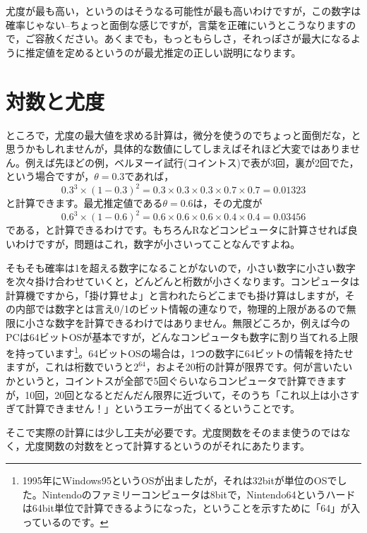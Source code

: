 \documentclass{ltjsarticle}
\begin{document}
尤度が最も高い，というのはそうなる可能性が最も高いわけですが，この数字は確率じゃない--ちょっと面倒な感じですが，言葉を正確にいうとこうなりますので，ご容赦ください。あくまでも，もっともらしさ，それっぽさが最大になるように推定値を定めるというのが最尤推定の正しい説明になります。
\section{対数と尤度}
ところで，尤度の最大値を求める計算は，微分を使うのでちょっと面倒だな，と思うかもしれませんが，具体的な数値にしてしまえばそれほど大変ではありません。例えば先ほどの例，ベルヌーイ試行(コイントス)で表が3回，裏が2回でた，という場合ですが，$\theta=0.3$であれば，
\[ 0.3^3 \times (1-0.3)^2 = 0.3 \times 0.3 \times 0.3 \times 0.7 \times 0.7 = 0.01323 \]
と計算できます。最尤推定値である$\theta=0.6$は，その尤度が
\[ 0.6^3 \times (1-0.6)^2 = 0.6 \times 0.6 \times 0.6 \times 0.4 \times 0.4 = 0.03456 \]
である，と計算できるわけです。もちろんRなどコンピュータに計算させれば良いわけですが，問題はこれ，数字が小さいってことなんですよね。

そもそも確率は1を超える数字になることがないので，小さい数字に小さい数字を次々掛け合わせていくと，どんどんと桁数が小さくなります。コンピュータは計算機ですから，「掛け算せよ」と言われたらどこまでも掛け算はしますが，その内部では数字とは言え0/1のビット情報の連なりで，物理的上限があるので無限に小さな数字を計算できるわけではありません。無限どころか，例えば今のPCは64ビットOSが基本ですが，どんなコンピュータも数字に割り当てれる上限を持っています\footnote{1995年にWindows95というOSが出ましたが，それは32bitが単位のOSでした。Nintendoのファミリーコンピュータは8bitで，Nintendo64というハードは64bit単位で計算できるようになった，ということを示すために「64」が入っているのです。}。64ビットOSの場合は，1つの数字に64ビットの情報を持たせますが，これは桁数でいうと$2^{64}$，およそ20桁の計算が限界です。何が言いたいかというと，コイントスが全部で5回ぐらいならコンピュータで計算できますが，10回，20回となるとだんだん限界に近づいて，そのうち「これ以上は小さすぎて計算できません！」というエラーが出てくるということです。

そこで実際の計算には少し工夫が必要です。尤度関数をそのまま使うのではなく，尤度関数の対数をとって計算するというのがそれにあたります。
\end{document}
